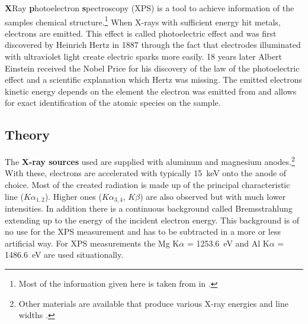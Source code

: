 \label{section:XPS} 
\textbf{X}Ray \textbf{p}hotoelectron \textbf{s}pectroscopy (XPS) is a tool to achieve information of the samples chemical structure.\footnote{Most of the information given here is taken from \cite{Riviere_90} in \cite{briggs_auger_1990}.}
When X-rays with sufficient energy hit metals, electrons are emitted. This effect is called photoelectric effect and was first discovered by Heinrich Hertz in 1887 through the fact that electrodes illuminated with ultraviolet light create electric sparks more easily. \cite{hertz_ueber_1887} 18 years later Albert Einstein received the Nobel Price for his discovery of the law of the photoelectric effect\cite{_nobel_2015} and a scientific explanation which Hertz was missing. The emitted electrons kinetic energy depends on the element the electron was emitted from and allows for exact identification of the atomic species on the sample.

\subsection{Theory}
The \textbf{X-ray sources} used are supplied with aluminum and magnesium anodes.\footnote{Other materials are available that produce various X-ray energies and line widths  \cite{_x-ray_2015}.} With these, electrons are accelerated with typically \SI{15}{\keV} onto the anode of choice. Most of the created radiation is made up of the principal characteristic line ($K\alpha_{1,2}$). Higher ones ($K\alpha_{3,4}$, $K\beta$) are also observed but with much lower intensities. In addition there is a continuous background called Bremsstrahlung extending up to the energy of the incident electron energy. This background is of no use for the XPS measurement and has to be subtracted in a more or less artificial way. For XPS measurements the Mg K$\alpha$ = \SI{1253.6}{\eV} and Al K$\alpha$ = \SI{1486.6}{\eV} are used situationally.


